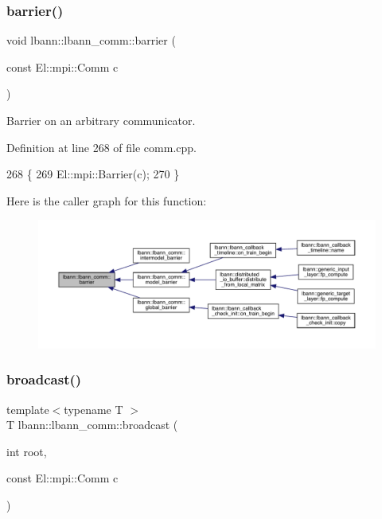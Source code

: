 \subsubsection{\texorpdfstring{barrier()}{barrier()}}
{\footnotesize\ttfamily void lbann\+::lbann\+\_\+comm\+::barrier (\begin{DoxyParamCaption}\item[{const El\+::mpi\+::\+Comm}]{c }\end{DoxyParamCaption})}

Barrier on an arbitrary communicator. 

Definition at line 268 of file comm.\+cpp.


\begin{DoxyCode}
268                                           \{
269   El::mpi::Barrier(c);
270 \}
\end{DoxyCode}
Here is the caller graph for this function\+:\nopagebreak
\begin{figure}[H]
\begin{center}
\leavevmode
\includegraphics[width=350pt]{classlbann_1_1lbann__comm_a303c02c5a127f3ed21f12c9a71cc90a6_icgraph}
\end{center}
\end{figure}
\mbox{\label{classlbann_1_1lbann__comm_af823b7ca3caccbd0710cd1435e60506b}} 
\subsubsection{\texorpdfstring{broadcast()}{broadcast()}\hspace{0.1cm}{\footnotesize\ttfamily [1/2]}}
{\footnotesize\ttfamily template$<$typename T $>$ \\
T lbann\+::lbann\+\_\+comm\+::broadcast (\begin{DoxyParamCaption}\item[{int}]{root,  }\item[{const El\+::mpi\+::\+Comm}]{c }\end{DoxyParamCaption})\hspace{0.3cm}{\ttfamily [inline]}}


